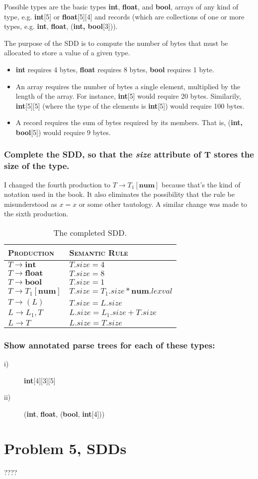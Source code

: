 Possible types are the basic types \textbf{int}, \textbf{float}, and \textbf{bool}, arrays of any kind of type, e.g. \textbf{int}[5] or \textbf{float}[5][4] and records (which are collections of one or more types, e.g. \textbf{int}, \textbf{float}, (\textbf{int, bool}[3])).

The purpose of the SDD is to compute the number of bytes that must be allocated to store a value of a given type.
\begin{itemize}
	\item \textbf{int} requires 4 bytes, \textbf{float} requires 8 bytes, \textbf{bool} requires 1 byte.
	\item An array requires the number of bytes a single element, multiplied by the length of the array. For instance, \textbf{int}[5] would require 20 bytes. Similarily, \textbf{int}[5][5] (where the type of the elements is \textbf{int}[5]) would require 100 bytes.
	\item A record requires the sum of bytes required by its members. That is, (\textbf{int, bool}[5]) would require 9 bytes.
\end{itemize}

\subsubsection{Complete the SDD, so that the \textit{size} attribute of T stores the size of the type.}
I changed the fourth production to $T\rightarrow T_{1}[\mathbf{num}]$ because that's the kind of notation used in the book.
It also eliminates the possibility that the rule be misunderstood as $x=x$ or some other tautology.
A similar change was made to the sixth production.
\begin{table}[H]
\centering
\begin{tabular}{l|l}
	\hline \hline
	\textsc{Production} 			& \textsc{Semantic Rule} \\ \hline
	$T \rightarrow \mathbf{int}$			& $T.size = 4$	\\
	$T \rightarrow \mathbf{float}$			& $T.size = 8$	\\
	$T \rightarrow \mathbf{bool}$ 			& $T.size = 1$	\\
	$T \rightarrow T_{1}\mathbf{[num]}$		& $T.size = T_1.size * \mathbf{num}.lexval$\\
	$T \rightarrow (L)$ 					& $T.size = L.size$ \\
	$L \rightarrow L_{1},T$					& $L.size = L_1.size + T.size$	\\
	$L \rightarrow T$						& $L.size = T.size$	\\
	\hline
\end{tabular}
\label{tab:4-a}
\caption{The completed SDD.}
\end{table}

\subsubsection{Show annotated parse trees for each of these types:}
\begin{description}
	\item[i)] \textbf{int}[4][3][5]
	\item[ii)] (\textbf{int}, \textbf{float}, (\textbf{bool}, \textbf{int}[4]))
\end{description}

\newpage
\section{Problem 5, SDDs}
????
